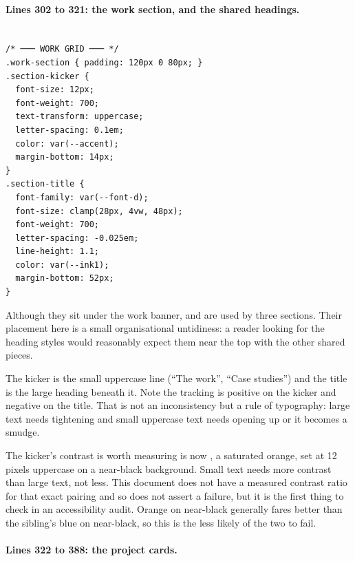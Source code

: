\paragraph{Lines 302 to 321: the work section, and the shared headings.}

\begin{lstlisting}[firstnumber=302,caption={\file{css/site.css}, lines 302--321}]

/* ─── WORK GRID ─── */
.work-section { padding: 120px 0 80px; }
.section-kicker {
  font-size: 12px;
  font-weight: 700;
  text-transform: uppercase;
  letter-spacing: 0.1em;
  color: var(--accent);
  margin-bottom: 14px;
}
.section-title {
  font-family: var(--font-d);
  font-size: clamp(28px, 4vw, 48px);
  font-weight: 700;
  letter-spacing: -0.025em;
  line-height: 1.1;
  color: var(--ink1);
  margin-bottom: 52px;
}
\end{lstlisting}

Although they sit under the work banner,  and
 are used by three sections. Their placement here is a small
organisational untidiness: a reader looking for the heading styles would reasonably
expect them near the top with the other shared pieces.

The kicker is the small uppercase line (``The work'', ``Case studies'') and the
title is the large heading beneath it. Note the tracking is positive on the kicker
and negative on the title. That is not an inconsistency but a rule of typography:
large text needs tightening and small uppercase text needs opening up or it becomes
a smudge.

\begin{honest}{The kicker's contrast is worth measuring}
 is now , a saturated orange, set at 12 pixels
uppercase on a near-black background. Small text needs more contrast than large
text, not less. This document does not have a measured contrast ratio for that
exact pairing and so does not assert a failure, but it is the first thing to check
in an accessibility audit. Orange on near-black generally fares better than the
sibling's blue on near-black, so this is the less likely of the two to fail.
\end{honest}

\paragraph{Lines 322 to 388: the project cards.}


